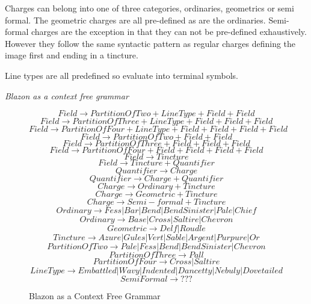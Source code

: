 Charges can belong into one of three categories, ordinaries, geometrics or semi formal.  The geometric charges are all pre-defined as are the ordinaries.  Semi-formal charges are the exception in that they can not be pre-defined exhaustively.  However they follow the same syntactic pattern as regular charges defining the image first and ending in a tincture.


Line types are all predefined so evaluate into terminal symbols. 


\emph{Blazon as a context free grammar}
\begin{figure}[H]

 \[
  Field \to  Partition  Of  Two + Line Type + Field + Field   \] \[
  Field \to  Partition  Of  Three + Line Type  + Field + Field + Field   \] \[
  Field \to  Partition  Of  Four + Line Type  + Field + Field + Field + Field \] \[
  Field \to  Partition  Of  Two  + Field + Field   \] \[
  Field \to  Partition  Of  Three + Field + Field + Field   \] \[
  Field \to  Partition  Of  Four + Field + Field + Field + Field \] \[
  Field \to  Tincture \] \[
  Field \to Tincture + Quantifier \] 
  \[Quantifier \to Charge\]
  \[Quantifier \to Charge + Quantifier\]
  \[Charge \to Ordinary  + Tincture \] \[
  Charge \to Geometric  + Tincture \] \[
  Charge \to Semi-formal + Tincture \] \[
  Ordinary \to Fess | Bar | Bend | Bend Sinister | Pale | Chief \]
  \[Ordinary \to Base | Cross | Saltire | Chevron  \] \[
  Geometric \to Delf | Roudle  \] \[
  Tincture \to Azure | Gules | Vert | Sable | Argent | Purpure | Or \] \[
  Partition  Of  Two \to Pale | Fess | Bend | Bend Sinister | Chevron \] \[
  Partition  Of  Three \to Pall \] \[
  Partition  Of  Four \to  Cross | Saltire  \] \[
  Line Type \to Embattled | Wavy | Indented | Dancetty | Nebuly | Dovetailed  \]
  \[ Semi Formal \to ???  \] 

\caption{Blazon as a Context Free Grammar}
\label{fig:grammar}

\end{figure}

